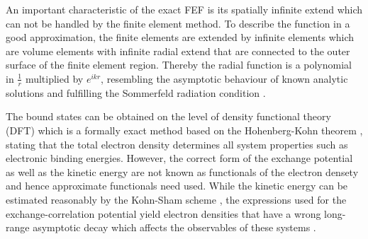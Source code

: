 An important characteristic of the exact FEF is its spatially infinite extend which can not be handled by the finite element method.
To describe the function in a good approximation, the finite elements are extended by infinite elements \cite{astley3, astley2, Astley,dreyer} which are volume elements with infinite radial extend that are connected to the outer surface of the finite element region.
Thereby the radial function is a polynomial in $\frac 1r$ multiplied by $e^{ikr}$, resembling the asymptotic behaviour of known analytic solutions and fulfilling the Sommerfeld radiation condition \cite{sommerfeldCond}.

The bound states can be obtained on the level of density functional theory (DFT) which is a formally exact method based on the Hohenberg-Kohn theorem \cite{HohenbergKohn}, stating that the total electron density determines all system properties such as electronic binding energies.
However, the correct form of the exchange potential as well as the kinetic energy are not known as functionals of the electron densety and hence approximate functionals need used.
While the kinetic energy can be estimated reasonably by the Kohn-Sham scheme \cite{KohnSham}, the expressions used for the exchange-correlation potential yield electron densities that have a wrong long-range asymptotic decay which affects the observables of these systems \cite{Koerzd1, Koerzd2, Bokareva}.
